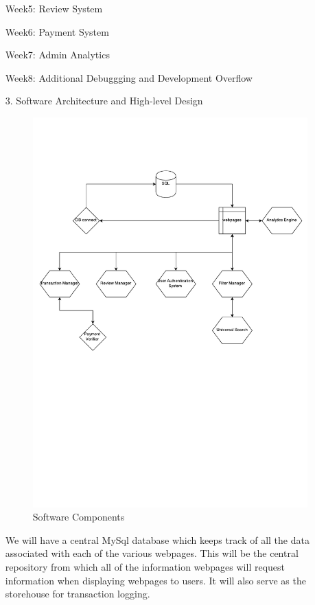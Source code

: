 \documentclass[12pt]{article}
\begin{document}
\begin{enumerate}
Week5: Review System

Week6: Payment System

Week7: Admin Analytics

Week8: Additional Debuggging and Development Overflow

\item[3.] Software Architecture and High-level Design
\begin{figure}[ht!]
\centering
\includegraphics[width=150mm]{swag.pdf}
\caption{Software Components \label{overflow}}
\end{figure}

We will have a central MySql database which keeps track of all the data associated with each of the various webpages. This will be the central repository from which all of the information webpages will request information when displaying webpages to users. It will also serve as the storehouse for transaction logging.


\end{enumerate}
\end{document}
